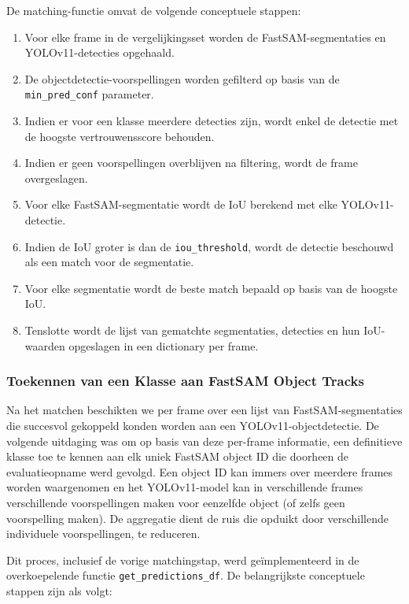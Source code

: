 De matching-functie omvat de volgende conceptuele stappen:
\begin{enumerate}
    \item Voor elke frame in de vergelijkingsset worden de FastSAM-segmentaties en YOLOv11-detecties opgehaald.
    \item De objectdetectie-voorspellingen worden gefilterd op basis van de\\ \texttt{min\_pred\_conf} parameter.
    \item Indien er voor een klasse meerdere detecties zijn, wordt enkel de detectie met de hoogste vertrouwensscore behouden.
    \item Indien er geen voorspellingen overblijven na filtering, wordt de frame overgeslagen.
    \item Voor elke FastSAM-segmentatie wordt de IoU berekend met elke YOLOv11-detectie.
    \item Indien de IoU groter is dan de \texttt{iou\_threshold}, wordt de detectie beschouwd als een match voor de segmentatie.
    \item Voor elke segmentatie wordt de beste match bepaald op basis van de hoogste IoU.
    \item Tenslotte wordt de lijst van gematchte segmentaties, detecties en hun IoU-waarden opgeslagen in een dictionary per frame.
\end{enumerate}

\subsubsection{Toekennen van een Klasse aan FastSAM Object Tracks}

Na het matchen beschikten we per frame over een lijst van FastSAM-segmentaties die 
succesvol gekoppeld konden worden aan een YOLOv11-objectdetectie.
De volgende uitdaging was om op basis van deze per-frame informatie, een definitieve klasse toe te kennen aan elk uniek FastSAM object ID
die doorheen de evaluatieopname werd gevolgd.
Een object ID kan immers over meerdere frames worden waargenomen 
en het YOLOv11-model kan in verschillende frames verschillende voorspellingen maken voor eenzelfde object (of zelfs geen voorspelling maken).
De aggregatie dient de ruis die opduikt door verschillende individuele voorspellingen, te reduceren.

Dit proces, inclusief de vorige matchingstap, werd geïmplementeerd in de overkoepelende functie \texttt{get\_predictions\_df}.
De belangrijkste conceptuele stappen zijn als volgt:

